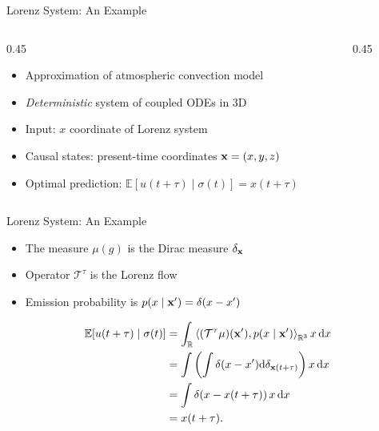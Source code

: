 \documentclass[10pt, aspectratio=169]{beamer}
\begin{document}
\begin{frame}{Lorenz System: An Example}
	\begin{columns}
		\begin{column}{0.45\textwidth}
		\begin{itemize}\addtolength{\itemsep}{8pt}
			\item Approximation of atmospheric convection model
			\item \emph{Deterministic} system of coupled ODEs in 3D
			\item Input: $x$ coordinate of Lorenz system
			\item Causal states: present-time coordinates $\vb{x}=(x,y,z)$
			\item Optimal prediction: $\mathbb{E}[u(t+\tau) \mid \sigma(t)] = x(t+\tau)$
		\end{itemize}
		\end{column}
		\hfill
		\begin{column}{0.45\textwidth}
			\centering
		\end{column}
	\end{columns}
\end{frame}

\begin{frame}{Lorenz System: An Example}
	\begin{itemize}\addtolength{\itemsep}{8pt}
		\item The measure $\mu(g)$ is the Dirac measure $\delta_{\vb{x}}$
		\item Operator $\mathcal{T^\tau}$ is the Lorenz flow
		\item Emission probability is $p(x \mid \vb{x}') = \delta(x-x')$
	\end{itemize}
	\bigskip
	\begin{align}
        \mathbb{E}[u(t+\tau) \mid \sigma(t)] &= \int_\mathbb{R} \left< (\mathcal{T}^\tau \mu)(\vb{x}'), p(x \mid \vb{x}') \right>_{\mathbb{R}^3} x \, \dd x \\
        &= \int \left( \int \delta(x-x') \dd \delta_{\vb{x}(t+\tau)} \right) x \, \dd x \\
        &= \int \delta(x-x(t+\tau))\, x \, \dd x \\
        &= x(t+\tau).
\end{align}
\end{frame}
\end{document}
